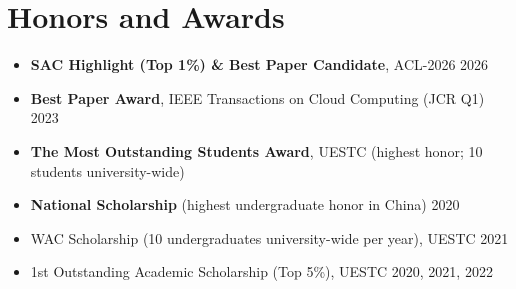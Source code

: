\documentclass[12pt,letterpaper]{article}
\begin{document}
\section{Honors and Awards}
\begin{itemize}
  \item \textbf{SAC Highlight (Top 1\%) \& Best Paper Candidate}, ACL-2026 \hfill 2026
  \item \textbf{Best Paper Award}, IEEE Transactions on Cloud Computing (JCR Q1) \hfill 2023
  \item \textbf{The Most Outstanding Students Award}, UESTC (highest honor; 10 students university-wide)
  \item \textbf{National Scholarship} (highest undergraduate honor in China) \hfill 2020
  \item WAC Scholarship (10 undergraduates university-wide per year), UESTC \hfill 2021
  \item 1st Outstanding Academic Scholarship (Top 5\%), UESTC \hfill 2020, 2021, 2022
\end{itemize}
\end{document}
